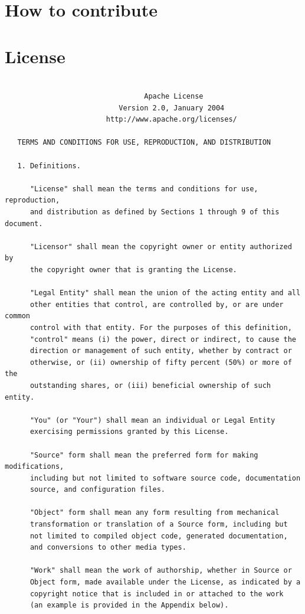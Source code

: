 \documentclass{book}
\begin{document}
\chapter{How to contribute}

\chapter{License}

\begin{verbatim}

                                 Apache License
                           Version 2.0, January 2004
                        http://www.apache.org/licenses/

   TERMS AND CONDITIONS FOR USE, REPRODUCTION, AND DISTRIBUTION

   1. Definitions.

      "License" shall mean the terms and conditions for use, reproduction,
      and distribution as defined by Sections 1 through 9 of this document.

      "Licensor" shall mean the copyright owner or entity authorized by
      the copyright owner that is granting the License.

      "Legal Entity" shall mean the union of the acting entity and all
      other entities that control, are controlled by, or are under common
      control with that entity. For the purposes of this definition,
      "control" means (i) the power, direct or indirect, to cause the
      direction or management of such entity, whether by contract or
      otherwise, or (ii) ownership of fifty percent (50%) or more of the
      outstanding shares, or (iii) beneficial ownership of such entity.

      "You" (or "Your") shall mean an individual or Legal Entity
      exercising permissions granted by this License.

      "Source" form shall mean the preferred form for making modifications,
      including but not limited to software source code, documentation
      source, and configuration files.

      "Object" form shall mean any form resulting from mechanical
      transformation or translation of a Source form, including but
      not limited to compiled object code, generated documentation,
      and conversions to other media types.

      "Work" shall mean the work of authorship, whether in Source or
      Object form, made available under the License, as indicated by a
      copyright notice that is included in or attached to the work
      (an example is provided in the Appendix below).


\end{verbatim}
\end{document}
